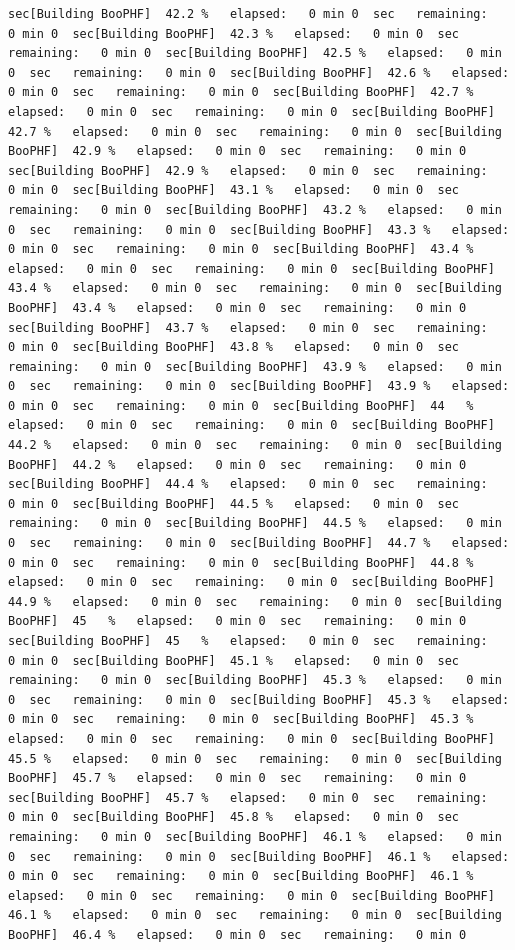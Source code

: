 \documentclass[
]{book}
\begin{document}
\begin{verbatim}
sec[Building BooPHF]  42.2 %   elapsed:   0 min 0  sec   remaining:   0 min 0  sec[Building BooPHF]  42.3 %   elapsed:   0 min 0  sec   remaining:   0 min 0  sec[Building BooPHF]  42.5 %   elapsed:   0 min 0  sec   remaining:   0 min 0  sec[Building BooPHF]  42.6 %   elapsed:   0 min 0  sec   remaining:   0 min 0  sec[Building BooPHF]  42.7 %   elapsed:   0 min 0  sec   remaining:   0 min 0  sec[Building BooPHF]  42.7 %   elapsed:   0 min 0  sec   remaining:   0 min 0  sec[Building BooPHF]  42.9 %   elapsed:   0 min 0  sec   remaining:   0 min 0  sec[Building BooPHF]  42.9 %   elapsed:   0 min 0  sec   remaining:   0 min 0  sec[Building BooPHF]  43.1 %   elapsed:   0 min 0  sec   remaining:   0 min 0  sec[Building BooPHF]  43.2 %   elapsed:   0 min 0  sec   remaining:   0 min 0  sec[Building BooPHF]  43.3 %   elapsed:   0 min 0  sec   remaining:   0 min 0  sec[Building BooPHF]  43.4 %   elapsed:   0 min 0  sec   remaining:   0 min 0  sec[Building BooPHF]  43.4 %   elapsed:   0 min 0  sec   remaining:   0 min 0  sec[Building BooPHF]  43.4 %   elapsed:   0 min 0  sec   remaining:   0 min 0  sec[Building BooPHF]  43.7 %   elapsed:   0 min 0  sec   remaining:   0 min 0  sec[Building BooPHF]  43.8 %   elapsed:   0 min 0  sec   remaining:   0 min 0  sec[Building BooPHF]  43.9 %   elapsed:   0 min 0  sec   remaining:   0 min 0  sec[Building BooPHF]  43.9 %   elapsed:   0 min 0  sec   remaining:   0 min 0  sec[Building BooPHF]  44   %   elapsed:   0 min 0  sec   remaining:   0 min 0  sec[Building BooPHF]  44.2 %   elapsed:   0 min 0  sec   remaining:   0 min 0  sec[Building BooPHF]  44.2 %   elapsed:   0 min 0  sec   remaining:   0 min 0  sec[Building BooPHF]  44.4 %   elapsed:   0 min 0  sec   remaining:   0 min 0  sec[Building BooPHF]  44.5 %   elapsed:   0 min 0  sec   remaining:   0 min 0  sec[Building BooPHF]  44.5 %   elapsed:   0 min 0  sec   remaining:   0 min 0  sec[Building BooPHF]  44.7 %   elapsed:   0 min 0  sec   remaining:   0 min 0  sec[Building BooPHF]  44.8 %   elapsed:   0 min 0  sec   remaining:   0 min 0  sec[Building BooPHF]  44.9 %   elapsed:   0 min 0  sec   remaining:   0 min 0  sec[Building BooPHF]  45   %   elapsed:   0 min 0  sec   remaining:   0 min 0  sec[Building BooPHF]  45   %   elapsed:   0 min 0  sec   remaining:   0 min 0  sec[Building BooPHF]  45.1 %   elapsed:   0 min 0  sec   remaining:   0 min 0  sec[Building BooPHF]  45.3 %   elapsed:   0 min 0  sec   remaining:   0 min 0  sec[Building BooPHF]  45.3 %   elapsed:   0 min 0  sec   remaining:   0 min 0  sec[Building BooPHF]  45.3 %   elapsed:   0 min 0  sec   remaining:   0 min 0  sec[Building BooPHF]  45.5 %   elapsed:   0 min 0  sec   remaining:   0 min 0  sec[Building BooPHF]  45.7 %   elapsed:   0 min 0  sec   remaining:   0 min 0  sec[Building BooPHF]  45.7 %   elapsed:   0 min 0  sec   remaining:   0 min 0  sec[Building BooPHF]  45.8 %   elapsed:   0 min 0  sec   remaining:   0 min 0  sec[Building BooPHF]  46.1 %   elapsed:   0 min 0  sec   remaining:   0 min 0  sec[Building BooPHF]  46.1 %   elapsed:   0 min 0  sec   remaining:   0 min 0  sec[Building BooPHF]  46.1 %   elapsed:   0 min 0  sec   remaining:   0 min 0  sec[Building BooPHF]  46.1 %   elapsed:   0 min 0  sec   remaining:   0 min 0  sec[Building BooPHF]  46.4 %   elapsed:   0 min 0  sec   remaining:   0 min 0  
\end{verbatim}
\end{document}
